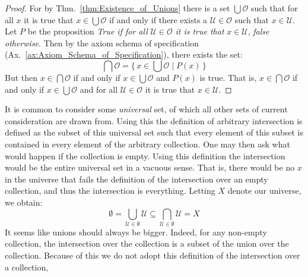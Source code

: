         \begin{proof}
            For by Thm.~\ref{thm:Existence_of_Unions} there is a set
            $\bigcup\mathcal{O}$ such that for all $x$ it is true that
            $x\in\bigcup\mathcal{O}$ if and only if there exists a
            $\mathcal{U}\in\mathcal{O}$ such that $x\in\mathcal{U}$. Let
            $P$ be the proposition \textit{True if for all}
            $\mathcal{U}\in\mathcal{O}$ \textit{it is true that}
            $x\in\mathcal{U}$, \textit{false otherwise}. Then by the
            axiom schema of specification
            (Ax.~\ref{ax:Axiom_Schema_of_Specification}), there exists the set:
            \begin{equation}
                \bigcap\mathcal{O}
                =\Big\{\,x\in\bigcup\mathcal{O}
                    \;|\;P(x)\,\Big\}
            \end{equation}
            But then $x\in\bigcap\mathcal{O}$ if and only if
            $x\in\bigcup\mathcal{O}$ and $P(x)$ is true. That is,
            $x\in\bigcap\mathcal{O}$ if and only if $x\in\bigcup\mathcal{O}$
            and for all $\mathcal{U}\in\mathcal{O}$ it is true that
            $x\in\mathcal{U}$.
        \end{proof}
        It is common to consider some \textit{universal} set, of which all
        other sets of current consideration are drawn from. Using this the
        definition of arbitrary intersection is defined as the subset of
        this universal set such that every element of this subset is
        contained in every element of the arbitrary collection. One may then
        ask what would happen if the collection is empty. Using this
        definition the intersection would be the entire universal set
        in a vacuous sense. That is, there would be no $x$ in the universe
        that fails the definition of the intersection over an empty
        collection, and thus the intersection is everything. Letting $X$
        denote our universe, we obtain:
        \begin{equation}
            \emptyset=\bigcup_{\mathcal{U}\in\emptyset}\mathcal{U}
                \subseteq\bigcap_{\mathcal{U}\in\emptyset}\mathcal{U}
            =X
        \end{equation}
        It seems like unions should always be bigger. Indeed, for any
        non-empty collection, the intersection over the collection is a
        subset of the union over the collection. Because of this we do
        not adopt this definition of the intersection over a collection,
